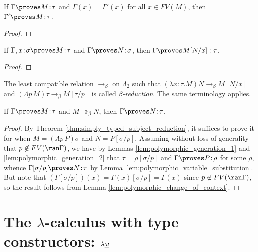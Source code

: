 \documentclass[reqno]{amsart}
\begin{document}
    \begin{lemma}\label{lem:polymorphic_change_of_context}
        If $\Gamma\proves M\!:\!\tau$ and $\Gamma(x)=\Gamma'(x)$ for all $x\in FV(M)$, then $\Gamma'\proves M\!:\!\tau$.
    \end{lemma}
    \begin{proof}
        \TODO
    \end{proof}

    \begin{lemma}\label{lem:polymorphic_substitution}
        If $\Gamma,x\!:\!\sigma\proves M\!:\!\tau$ and $\Gamma\proves N\!:\!\sigma$, then $\Gamma\proves M[N/x]:\tau$.
    \end{lemma}
    \begin{proof}
        \TODO
    \end{proof}

    \begin{definition}
        The least compatible relation $\rightarrow_\beta$ on $\Lambda_2$ such that $(\lambda x\!:\!\tau.M)N\rightarrow_\beta M[N/x]$ and $(\Lambda p\,M)\tau\rightarrow_\beta M[\tau/p]$ is called \textit{$\beta$-reduction}. The same terminology applies.
    \end{definition}

    \begin{theorem}\label{thm:polymorphic_subject_reduction}
        If $\Gamma\proves M\!:\!\tau$ and $M\twoheadrightarrow_\beta N$, then $\Gamma\proves N\!:\!\tau$.
    \end{theorem}
    \begin{proof}
        By Theorem \ref{thm:simply_typed_subject_reduction}, it suffices to prove it for when $M=(\Lambda p\,P)\sigma$ and $N=P[\sigma/p]$. Assuming without loss of generality that $p\not\in FV(\ran\Gamma)$, we have by Lemmas \ref{lem:polymorphic_generation_1} and \ref{lem:polymorphic_generation_2} that $\tau=\rho[\sigma/p]$ and $\Gamma\proves P\!:\!\rho$ for some $\rho$, whence $\Gamma[\sigma/p]\proves N\!:\!\tau$ by Lemma \ref{lem:polymorphic_variable_substitution}. But note that $(\Gamma[\sigma/p])(x)=\Gamma(x)[\sigma/p]=\Gamma(x)$ since $p\not\in FV(\ran\Gamma)$, so the result follows from Lemma \ref{lem:polymorphic_change_of_context}. 
    \end{proof}

    \section{The $\lambda$-calculus with type constructors: $\lambda\uline{\omega}$}
\end{document}
